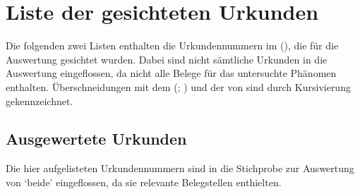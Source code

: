 \chapter{Liste der gesichteten Urkunden}
\label{sec:urkliste}

Die folgenden zwei Listen enthalten die Urkundennummern im  (\CAO), die für die Auswertung gesichtet wurden.
Dabei sind nicht sämtliche Urkunden in die Auswertung eingeflossen, da nicht
alle Belege für das untersuchte Phänomen enthalten. Überschneidungen mit dem
 (\REM; \nosh\cite{rem}) und der
 von \citet{ksw3,ksw2}
sind durch Kursivierung gekennzeichnet.

\section{Ausgewertete Urkunden}
\label{subsec:ausgewurk}

Die hier aufgelisteten Urkundennummern sind in die Stichprobe zur Auswertung von
 `beide' eingeflossen, da sie relevante Belegstellen enthielten.

